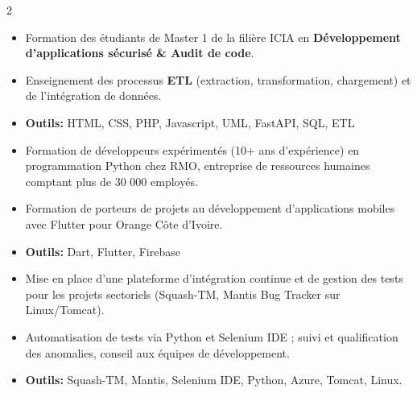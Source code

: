 \documentclass[10pt,a4paper,ragged2e,withhyper]{altacv}
\begin{document}
\begin{paracol}{2}
            \begin{itemize}
                \item Formation des étudiants de Master 1 de la filière ICIA en {\textbf{Développement d'applications sécurisé \& Audit de code}}.
                \item Enseignement des processus \textbf{ETL} (extraction, transformation, chargement) et de l'intégration de données.
                \item \textcolor{SecondaryColor}{\textbf{Outils: }} HTML, CSS, PHP, Javascript, UML, FastAPI, SQL, ETL
            \end{itemize}
            \divider

            \begin{itemize}
                \item Formation de développeurs expérimentés (10+ ans d'expérience) en programmation Python chez RMO, entreprise de ressources humaines comptant plus de 30 000 employés.
            \end{itemize}
            \divider
            
            \begin{itemize}
                \item Formation de porteurs de projets au développement d'applications mobiles avec Flutter pour Orange Côte d'Ivoire.
                \item \textcolor{SecondaryColor}{\textbf{Outils: }} Dart, Flutter, Firebase
            \end{itemize}

        \divider

        \begin{itemize}
            \item Mise en place d'une plateforme d'intégration continue et de gestion des tests pour les projets sectoriels (Squash-TM, Mantis Bug Tracker sur Linux/Tomcat).
            \item Automatisation de tests via Python et Selenium IDE ; suivi et qualification des anomalies, conseil aux équipes de développement.
            \item \textcolor{SecondaryColor}{\textbf{Outils: }} Squash-TM, Mantis, Selenium IDE, Python, Azure, Tomcat, Linux.
        \end{itemize}


\end{paracol}
\end{document}
